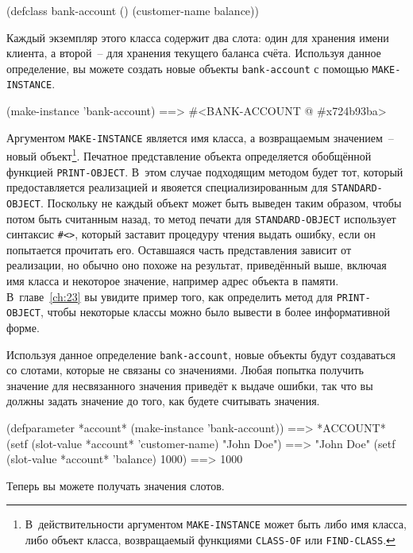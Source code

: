 \begin{myverb}
(defclass bank-account ()
  (customer-name
   balance))
\end{myverb}

Каждый экземпляр этого класса содержит два слота: один для хранения имени клиента, а
второй~-- для хранения текущего баланса счёта.  Используя данное определение, вы можете
создать новые объекты \lstinline{bank-account} с помощью \lstinline{MAKE-INSTANCE}.

\begin{myverb}
(make-instance 'bank-account) ==> #<BANK-ACCOUNT @ #x724b93ba>
\end{myverb}

Аргументом \lstinline{MAKE-INSTANCE} является имя класса, а возвращаемым значением~-- новый
объект\footnote{В~действительности аргументом \lstinline{MAKE-INSTANCE} может быть либо имя
  класса, либо объект класса, возвращаемый функциями \lstinline{CLASS-OF} или
  \lstinline{FIND-CLASS}.}.  Печатное представление объекта определяется обобщённой функцией
\lstinline{PRINT-OBJECT}.  В~этом случае подходящим методом будет тот, который предоставляется
реализацией и явояется специализированным для \lstinline{STANDARD-OBJECT}.  Поскольку не каждый объект
может быть выведен таким образом, чтобы потом быть считанным назад, то метод печати для
\lstinline{STANDARD-OBJECT} использует синтаксис \lstinline!#<>!, который заставит процедуру
чтения выдать ошибку, если он попытается прочитать его.  Оставшаяся часть представления
зависит от реализации, но обычно оно похоже на результат, приведённый выше, включая имя
класса и некоторое значение, например адрес объекта в памяти.  В~главе~\ref{ch:23} вы
увидите пример того, как определить метод для \lstinline{PRINT-OBJECT}, чтобы некоторые классы
можно было вывести в более информативной форме.

Используя данное определение \lstinline{bank-account}, новые объекты будут создаваться со
слотами, которые не связаны со значениями.  Любая попытка получить значение для
несвязанного значения приведёт к выдаче ошибки, так что вы должны задать значение до того,
как будете считывать значения.

\begin{myverb}
(defparameter *account* (make-instance 'bank-account))  ==> *ACCOUNT*
(setf (slot-value *account* 'customer-name) "John Doe") ==> "John Doe"
(setf (slot-value *account* 'balance) 1000)             ==> 1000
\end{myverb}

Теперь вы можете получать значения слотов.

